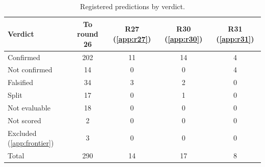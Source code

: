 \begin{table}[htbp]
\centering
\caption{Registered predictions by verdict.}
\label{tab:ledger-totals}
\footnotesize
\begin{tabular}{lcccc}
\toprule
Verdict & To round 26 & R27 (\cref{app:r27}) & R30 (\cref{app:r30}) & R31 (\cref{app:r31}) \\
\midrule
Confirmed & 202 & 11 & 14 & 4 \\
Not confirmed & 14 & 0 & 0 & 4 \\
Falsified & 34 & 3 & 2 & 0 \\
Split & 17 & 0 & 1 & 0 \\
Not evaluable & 18 & 0 & 0 & 0 \\
Not scored & 2 & 0 & 0 & 0 \\
Excluded (\cref{app:frontier}) & 3 & 0 & 0 & 0 \\
\midrule
Total & 290 & 14 & 17 & 8 \\
\bottomrule
\end{tabular}
\end{table}

